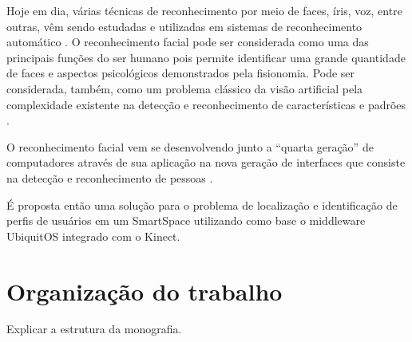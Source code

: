 Hoje em dia, várias técnicas de reconhecimento por meio de faces, íris, voz, entre outras, vêm sendo estudadas e utilizadas em sistemas de reconhecimento automático \cite{bolle}. O reconhecimento facial pode ser considerada como uma das principais funções do ser humano pois permite identificar uma grande quantidade de faces e aspectos psicológicos demonstrados pela fisionomia. Pode ser considerada, também, como um problema clássico da visão artificial pela complexidade existente na detecção e reconhecimento de características e padrões \cite{saocarlos}.

O reconhecimento facial vem se desenvolvendo junto a ``quarta geração'' de computadores através de sua aplicação na nova geração de interfaces que consiste na detecção e reconhecimento de pessoas \cite{saocarlos}. 

É proposta então uma solução para o problema de localização e identificação de perfis de usuários em um SmartSpace utilizando como base o middleware UbiquitOS \cite{alegomes} integrado com o Kinect.

\section{Organização do trabalho}

	Explicar a estrutura da monografia.













